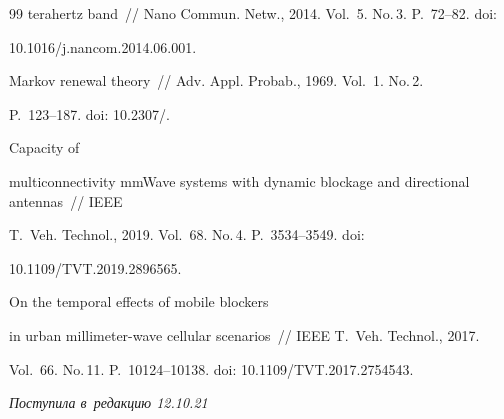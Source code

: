 {{\begin{thebibliography}{99}
terahertz band~/\!\!/ Nano Commun. Netw., 2014. Vol.~5. No.\,3. P.~72--82. doi: 


10.1016\!/\!j.nancom.2014.06.001.




 Markov renewal theory~/\!\!/ Adv. Appl. Probab., 1969. Vol.~1. No.\,2. 


P.~123--187. doi: 10.2307\!/.




 Capacity of 


multiconnectivity mmWave systems with dynamic blockage and directional antennas~/\!\!/ IEEE 


T.~Veh. Technol., 2019. Vol.~68. No.\,4. P.~3534--3549. doi: 


10.1109\!/\!TVT.2019.2896565.




 On the temporal effects of mobile blockers 


in urban millimeter-wave cellular scenarios~/\!\!/ IEEE T.~Veh. Technol., 2017. 


Vol.~66. No.\,11. P.~10124--10138. doi: 10.1109\!/\linebreak TVT.2017.2754543.


       \end{thebibliography}


} }











\vspace*{-3pt}





\hfill{\small\textit{Поступила в~редакцию 12.10.21}}















